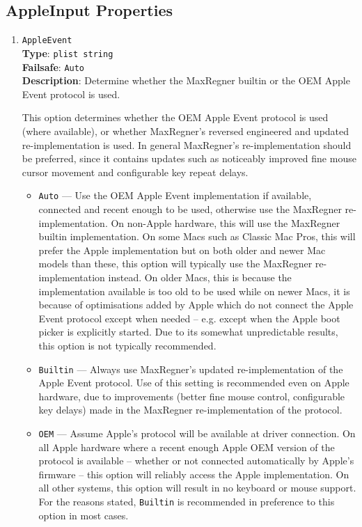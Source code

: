 \documentclass[]{article}
\makeatletter
\providecommand{\tightlist}{%
  \setlength{\itemsep}{0pt}\setlength{\parskip}{0pt}}
\renewcommand{\label}[1]{%
\zref@wrapper@immediate{\oldlabel{#1}}}  %
\makeatother
\begin{document}
\begin{enumerate}
\end{enumerate}

\subsection{AppleInput Properties}\label{uefiappleinputprops}

\begin{enumerate}

\item
  \texttt{AppleEvent}\\
  \textbf{Type}: \texttt{plist\ string}\\
  \textbf{Failsafe}: \texttt{Auto}\\
  \textbf{Description}: Determine whether the MaxRegner builtin or the OEM Apple Event protocol is used.

  This option determines whether the OEM Apple Event protocol is used (where available), or
  whether MaxRegner's reversed engineered and updated re-implementation is used. In general
  MaxRegner's re-implementation should be preferred, since it contains updates such as noticeably
  improved fine mouse cursor movement and configurable key repeat delays.

  \begin{itemize}
  \tightlist
  \item \texttt{Auto} --- Use the OEM Apple Event implementation if available, connected and
  recent enough to be used, otherwise use the MaxRegner re-implementation.
  On non-Apple hardware, this will use the MaxRegner builtin implementation.
  On some Macs such as Classic Mac Pros, this will prefer the Apple implementation but on both older and
  newer Mac models than these, this option will typically use the MaxRegner re-implementation instead.
  On older Macs, this is because the implementation available is too old to be used while on newer Macs,
  it is because of optimisations added by Apple which do not connect the Apple Event protocol
  except when needed -- e.g. except when the Apple boot picker is explicitly started.
  Due to its somewhat unpredictable results, this option is not typically recommended.
  \item \texttt{Builtin} ---  Always use MaxRegner's updated re-implementation of the Apple Event protocol.
  Use of this setting is recommended even on Apple hardware, due to
  improvements (better fine mouse control, configurable key delays) made in the MaxRegner re-implementation
  of the protocol.
  \item \texttt{OEM} --- Assume Apple's protocol will be available at driver connection. On all Apple hardware
  where a recent enough Apple OEM version of the protocol is available -- whether or not connected automatically
  by Apple's firmware -- this option will reliably access the Apple implementation. On all other systems, this
  option will result in no keyboard or mouse support. For the reasons stated, \texttt{Builtin} is recommended in
  preference to this option in most cases.
  \end{itemize}


\end{enumerate}
\end{document}
